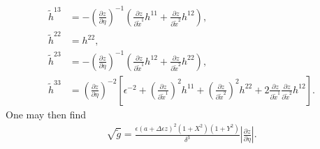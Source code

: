 \documentclass{article}
\begin{document}
\begin{align}
\tilde{h}^{13}&=-\left( \frac{\partial z}{\partial \eta} \right)^{-1} \left( \frac{\partial z}{\partial \tilde{x}^1} h^{11} + \frac{\partial z}{\partial \tilde{x}^2} h^{12} \right), \\
\tilde{h}^{22}&=h^{22}, \\
\tilde{h}^{23}&=-\left( \frac{\partial z}{\partial \eta} \right)^{-1} \left( \frac{\partial z}{\partial \tilde{x}^1} h^{12} + \frac{\partial z}{\partial \tilde{x}^2} h^{22} \right), \\
\tilde{h}^{33}&=\left( \frac{\partial z}{\partial \eta} \right)^{-2} \left[ \epsilon^{-2} + \left( \frac{\partial z}{\partial \tilde{x}^1} \right)^2 h^{11} + \left( \frac{\partial z}{\partial \tilde{x}^2} \right)^2 h^{22} +2\frac{\partial z}{\partial \tilde{x}^1} \frac{\partial z}{\partial \tilde{x}^2} h^{12}\right].
\end{align}
One may then find
\begin{align}
\sqrt{\tilde{g}}=\frac{\epsilon(a+\Delta\epsilon z)^2 (1+X^2)(1+Y^2)}{\delta^3}\left|\frac{\partial z}{\partial\eta}\right|. \label{rgt}
\end{align}
\end{document}
